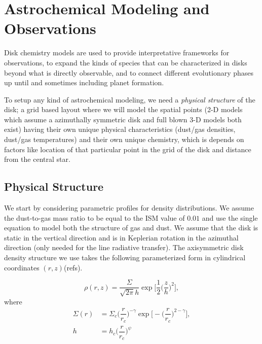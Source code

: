 \chapter{Astrochemical Modeling and Observations}
Disk chemistry models are used to provide interpretative frameworks for observations, to expand the kinds of species that can be characterized in disks beyond what is directly observable, and to connect different evolutionary phases up until and sometimes including planet formation.

To setup any kind of astrochemical modeling, we need a \textit{physical structure} of the disk; a grid based layout where we will model the spatial points (2-D models which assume a azimuthally symmetric disk and full blown 3-D models both exist) having their own unique physical characteristics (dust/gas densities, dust/gas temperatures) and their own unique chemistry, which is depends on factors like location of that particular point in the grid of the disk and distance from the central star.

\section{Physical Structure}
We start by considering parametric profiles for density distributions. We assume the dust-to-gas mass ratio to be equal to the ISM value of $0.01$ and use the single equation to model both the structure of gas and dust. We assume that the disk is static in the vertical direction and is in Keplerian rotation in the azimuthal direction (only needed for the line radiative transfer). The axisymmetric disk density structure we use takes the following parameterized form in cylindrical coordinates $(r, z)$(refs).

\begin{equation}
	\rho (r, z) = \dfrac{\Sigma}{\sqrt{2 \pi} h} \exp \Bigg[\dfrac{1}{2}\Big(\dfrac{z}{h}\Big)^2\Bigg],
\end{equation}
where
\begin{equation}
	\begin{split}
		\Sigma (r) &= \Sigma_c \Bigg(\dfrac{r}{r_c}\Bigg)^{-\gamma} \exp \Bigg[-\Bigg(\dfrac{r}{r_c}\Bigg)^{2-\gamma}\Bigg], \\
		h &= h_c \Bigg(\dfrac{r}{r_c}\Bigg)^{\psi}
	\end{split}
\end{equation}

